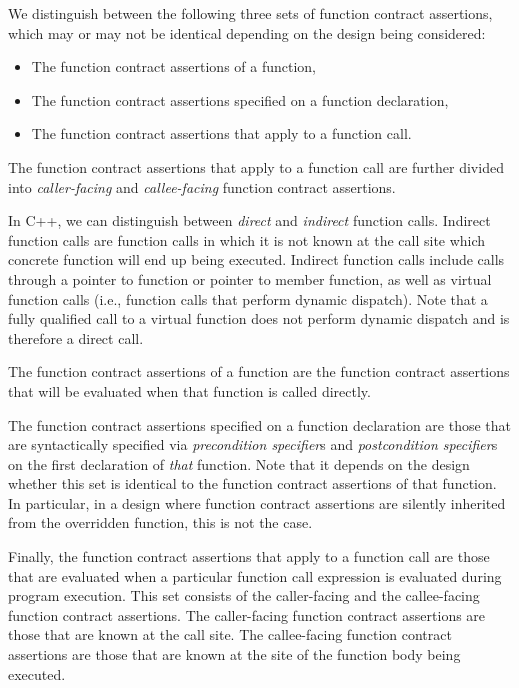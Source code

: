We distinguish between the following three sets of function contract assertions, which may or may not be identical depending on the design being considered:

\begin{itemize}
\item The function contract assertions of a function,
\item The function contract assertions specified on a function declaration,
\item The function contract assertions that apply to a function call.
\end{itemize}

The function contract assertions that apply to a function call are further divided into  \emph{caller-facing} and \emph{callee-facing} function contract assertions.

In C++, we can distinguish between \emph{direct} and \emph{indirect} function calls. Indirect function calls are function calls in which it is not known at the call site which concrete function will end up being executed. Indirect function calls include calls through a pointer to function or pointer to member function, as well as virtual function calls (i.e., function calls that perform dynamic dispatch). Note that a fully qualified call to a virtual function does not perform dynamic dispatch and is therefore a direct call.

The function contract assertions of a function are the function contract assertions that will be evaluated when that function is called directly.

The function contract assertions specified on a function declaration are those that are syntactically specified via \emph{precondition specifier}s and \emph{postcondition specifier}s on the first declaration of \emph{that} function. Note that it depends on the design whether this set is identical to the function contract assertions of that function. In particular, in a design where function contract assertions are silently inherited from the overridden function, this is not the case.

Finally, the function contract assertions that apply to a function call are those that are evaluated when a particular function call expression is evaluated during program execution. This set consists of the caller-facing and the callee-facing function contract assertions. The caller-facing function contract assertions are those that are known at the call site. The callee-facing function contract assertions are those that are known at the site of the function body being executed.

